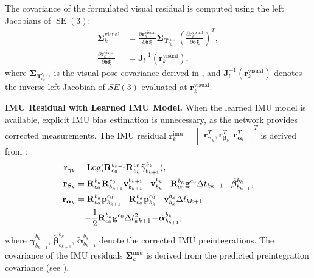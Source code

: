 The covariance of the formulated visual residual is computed using the left Jacobians of $\operatorname{SE}(3)$: 
\begin{equation}
\begin{aligned}
\bm{\Sigma}^{\text{visual}}_k &= \frac{\partial{\mathbf{r}^\text{visual}_k}}{\partial{\bm{\delta \xi}}} \bm{\Sigma}_{\mathbf{T}^{c_{k-1}}_{c_k}} (\frac{\partial{\mathbf{r}^\text{visual}_k}}{\partial{\bm{\delta \xi}}})^{T},\\
\frac{\partial{\mathbf{r}^\text{visual}_k}}{\partial{\bm{\delta \xi}}} &= \mathbf{J}^{-1}_l(\mathbf{r}^\text{visual}_k),
\end{aligned}
\end{equation}
where $\bm{\Sigma}_{\mathbf{T}^{c_{k-1}}_{c_k}}$ is the visual pose covariance derived in , and $\mathbf{J}^{-1}_l(\mathbf{r}^\text{visual}_k)$ denotes the inverse left Jacobian of $SE(3)$ evaluated at $\mathbf{r}^{\text{visual}}_k$.

\noindent \textbf{IMU Residual with Learned IMU Model.} When the learned IMU model is available, explicit IMU bias estimation is unnecessary, as the network provides corrected measurements. The IMU residual $\mathbf{r}^{\text{imu}}_k = \begin{bmatrix}
\mathbf{r}_{\bm{\gamma}_k}^T, \mathbf{r}_{\bm{\beta}_k}^T, \mathbf{r}_{\bm{\alpha}_k}^T
\end{bmatrix}^T$ is derived from :
\begin{align}
\label{eq:maci2:inte_res_r}
\mathbf{r}_{\bm{\gamma}_k} &= \text{Log} (\mathbf{R}^{b_{k+1}}_{c_0} \mathbf{R}^{c_0}_{b_k}\tilde{\boldsymbol{\gamma}}_{b_{k+1}}^{b_k}), \\
\mathbf{r}_{\bm{\beta}_k} &= \mathbf{R}^{b_k}_{c_0} \mathbf{R}^{c_0}_{b_{k+1}} \mathbf{v}_{b_{k+1}}^{b_{k+1}} \!-\! \mathbf{v}_{b_k}^{b_k} \!-\! \mathbf{R}^{b_k}_{c_0} \mathbf{g}^{c_0} \Delta t_{kk+1} \!-\! \tilde{\boldsymbol{\beta}}_{b_{k+1}}^{b_k},
\label{eq:maci2:inte_res_v}
\\
\mathbf{r}_{\bm{\alpha}_k} &= \mathbf{R}^{b_k}_{c_0} \mathbf{p}_{b_{k+1}}^{c_0} \!-\! \mathbf{R}^{b_k}_{c_0} \mathbf{p}_{b_k}^{c_0} \!-\! \mathbf{v}_{b_k}^{b_k}\Delta t_{kk+1} \notag \\
& \quad \!-\! \frac{1}{2}\mathbf{R}^{b_k}_{c_0}\mathbf{g}^{c_0}\Delta t_{kk+1}^2 \!-\! \tilde{\boldsymbol{\alpha}}_{b_{k+1}}^{b_k},
\label{eq:maci2:inte_res_p}
\end{align}
where $\tilde{\boldsymbol{\gamma}}_{b_{k+1}}^{b_k}$, $\tilde{\boldsymbol{\beta}}_{b_{k+1}}^{b_k}$, $\tilde{\boldsymbol{\alpha}}_{b_{k+1}}^{b_k}$ denote the corrected IMU preintegrations. The covariance of the IMU residuals $\bm{\Sigma}^{\text{imu}}_k$ is derived from the predicted preintegration covariance (see ).

